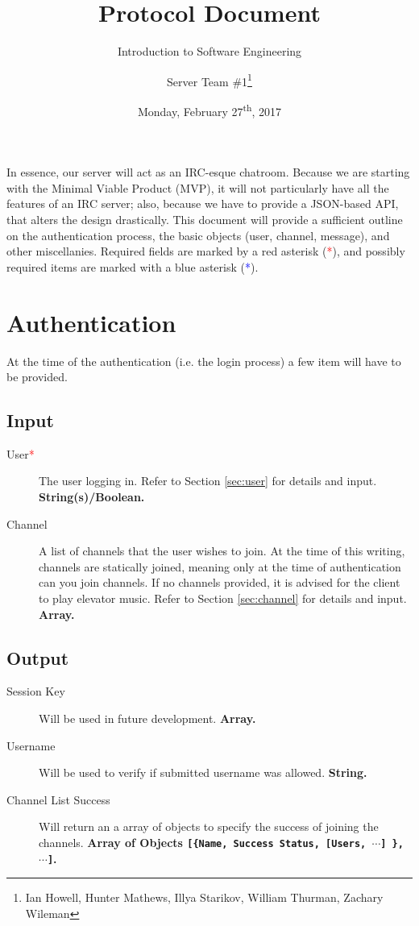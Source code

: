 \documentclass[12pt]{scrartcl}
\title{Protocol Document}
\subtitle{Introduction to Software Engineering}
\author{Server Team \#1\thanks{Ian Howell, Hunter Mathews, Illya Starikov, William Thurman, Zachary Wileman}}
\date{Monday, February 27\textsuperscript{th}, 2017}
\newcommand{\req}{\textcolor{red}{*}}
\newcommand{\reqalt}{\textcolor{blue}{*}}
\begin{document}
\maketitle

In essence, our server will act as an IRC-esque chatroom. Because we are starting with the Minimal Viable Product (MVP), it will not particularly have all the features of an IRC server; also, because we have to provide a JSON-based API, that alters the design drastically. This document will provide a sufficient outline on the authentication process, the basic objects (user, channel, message), and other miscellanies. Required fields are marked by a red asterisk (\req), and possibly required items are marked with a blue asterisk (\reqalt).


\section{Authentication}
At the time of the authentication (i.e. the login process) a few item will have to be provided.

\subsection{Input}
\begin{description}
    \item[User\req] The user logging in. Refer to Section \ref{sec:user} for details and input. \textbf{String(s)/Boolean.}
    \item[Channel] A list of channels that the user wishes to join. At the time of this writing, channels are statically joined, meaning only at the time of authentication can you join channels. If no channels provided, it is advised for the client to play elevator music. Refer to Section \ref{sec:channel} for details and input. \textbf{Array.}
\end{description}

\subsection{Output}
\begin{description}
    \item[Session Key] Will be used in future development. \textbf{Array.}
    \item[Username] Will be used to verify if submitted username was allowed. \textbf{String.}
    \item[Channel List Success] Will return an a array of objects to specify the success of joining the channels. \textbf{Array of Objects \texttt{[\{Name, Success Status, [Users, $\cdots$] \}, $\cdots$]}.}
\end{description}
\end{document}
